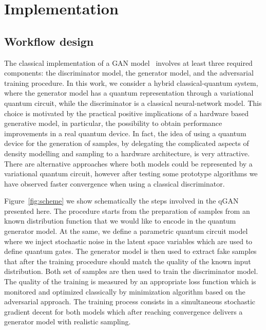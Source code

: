 \documentclass[twocolumn,preprintnumbers,superscriptaddress]{revtex4-2}
\begin{document}
\section{Implementation}
\label{sec:implementation}

\subsection{Workflow design}

The classical implementation of a GAN model~\cite{goodfellow2014generative}
involves at least three required components: the discriminator model, the
generator model, and the adversarial training procedure. In this work, we
consider a hybrid classical-quantum system, where the generator model has a
quantum representation through a variational quantum circuit, while the
discriminator is a classical neural-network model. This choice is motivated by
the practical positive implications of a hardware based generative model, in
particular, the possibility to obtain performance improvements in a real quantum
device. In fact, the idea of using a quantum device for the generation of
samples, by delegating the complicated aspects of density modelling and sampling
to a hardware architecture, is very attractive.
%
There are alternative approaches where both models could be represented by a
variational quantum circuit, however after testing some prototype algorithms we
have observed faster convergence when using a classical discriminator.

Figure~\ref{fig:scheme} we show schematically the steps involved in the qGAN
presented here. The procedure starts from the preparation of samples from an
known distribution function that we would like to encode in the quantum
generator model. At the same, we define a parametric quantum circuit model where
we inject stochastic noise in the latent space variables which are used to
define quantum gates. The generator model is then used to extract fake samples
that after the training procedure should match the quality of the known input
distribution. Both set of samples are then used to train the discriminator
model. The quality of the training is measured by an appropriate loss function
which is monitored and optimized classically by minimization algorithm based on
the adversarial approach. The training process consists in a simultaneous
stochastic gradient decent for both models which after reaching convergence
delivers a generator model with realistic sampling.
\end{document}
